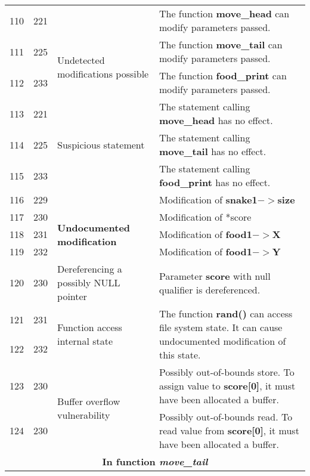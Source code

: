 \documentclass[]{article}
\begin{document}
\begin{longtable}{ |p{0.5cm}|p{0.75cm}|p{3cm}|p{9cm}|  }
		110 & 221 & & The function \textbf{move\_head} can modify parameters passed. \\
		111 & 225 & \multirow{2}{80.0pt}{Undetected modifications possible} & The function \textbf{move\_tail} can modify parameters passed. \\ 
		112 & 233 & &The function \textbf{food\_print} can modify parameters passed. \\
		\hline 
		113 & 221 & \multirow{3}{50.0pt}{Suspicious statement} & The statement calling \textbf{move\_head} has no effect. \\
		114 & 225 & & The statement calling \textbf{move\_tail} has no effect. \\ 
		115 & 233 & & The statement calling \textbf{food\_print} has no effect. \\
		\hline 
		116 & 229 & & Modification of \textbf{snake1$->$size} \\
		117 & 230 & \multirow{3}{90.0pt}{\textbf{Undocumented modification}} & Modification of *score \\
		118 & 231 & & Modification of \textbf{food1$->$X} \\
		119 & 232 & & Modification of \textbf{food1$->$Y} \\
		\hline 
		120 & 230 & Dereferencing a possibly NULL pointer & Parameter \textbf{score} with null qualifier is dereferenced. \\
		\hline 
		121 & 231 & \multirow{2}{120.0pt}{Function access internal state} & \multirow{2}{300.0pt}{The function \textbf{rand()} can access file system state. It can cause undocumented modification of this state.} \\ 
		122 & 232 & & \\
		\hline 
		123 & 230 & \multirow{2}{60.0pt}{Buffer overflow vulnerability} & Possibly out-of-bounds store. To assign value to \textbf{score[0]}, it must have been allocated a buffer.  \\
		124 & 230 & & Possibly out-of-bounds read. To read value from \textbf{score[0]}, it must have been allocated a buffer. \\
		
		\hline 
		\multicolumn{4}{|c|}{\textbf{In function \textit{move\_tail}}} \\
		\hline 
		

\end{longtable}
\end{document}
